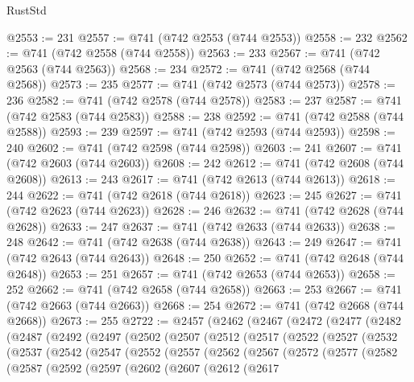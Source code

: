 \begin{lexlean}{RustStd}
\begin{coremodule}
@2553 := 231
@2557 := @741 (@742 @2553 (@744 @2553))
@2558 := 232
@2562 := @741 (@742 @2558 (@744 @2558))
@2563 := 233
@2567 := @741 (@742 @2563 (@744 @2563))
@2568 := 234
@2572 := @741 (@742 @2568 (@744 @2568))
@2573 := 235
@2577 := @741 (@742 @2573 (@744 @2573))
@2578 := 236
@2582 := @741 (@742 @2578 (@744 @2578))
@2583 := 237
@2587 := @741 (@742 @2583 (@744 @2583))
@2588 := 238
@2592 := @741 (@742 @2588 (@744 @2588))
@2593 := 239
@2597 := @741 (@742 @2593 (@744 @2593))
@2598 := 240
@2602 := @741 (@742 @2598 (@744 @2598))
@2603 := 241
@2607 := @741 (@742 @2603 (@744 @2603))
@2608 := 242
@2612 := @741 (@742 @2608 (@744 @2608))
@2613 := 243
@2617 := @741 (@742 @2613 (@744 @2613))
@2618 := 244
@2622 := @741 (@742 @2618 (@744 @2618))
@2623 := 245
@2627 := @741 (@742 @2623 (@744 @2623))
@2628 := 246
@2632 := @741 (@742 @2628 (@744 @2628))
@2633 := 247
@2637 := @741 (@742 @2633 (@744 @2633))
@2638 := 248
@2642 := @741 (@742 @2638 (@744 @2638))
@2643 := 249
@2647 := @741 (@742 @2643 (@744 @2643))
@2648 := 250
@2652 := @741 (@742 @2648 (@744 @2648))
@2653 := 251
@2657 := @741 (@742 @2653 (@744 @2653))
@2658 := 252
@2662 := @741 (@742 @2658 (@744 @2658))
@2663 := 253
@2667 := @741 (@742 @2663 (@744 @2663))
@2668 := 254
@2672 := @741 (@742 @2668 (@744 @2668))
@2673 := 255
@2722 := @2457
    (@2462
      (@2467
        (@2472
          (@2477
            (@2482
              (@2487
                (@2492
                  (@2497
                    (@2502
                      (@2507
                        (@2512
                          (@2517
                            (@2522
                              (@2527
                                (@2532
                                  (@2537
                                    (@2542
                                      (@2547
                                        (@2552
                                          (@2557
                                            (@2562
                                              (@2567
                                                (@2572
                                                  (@2577
                                                    (@2582
                                                      (@2587
                                                        (@2592
                                                          (@2597
                                                            (@2602
                                                              (@2607
                                                                (@2612
                                                                  (@2617

\end{coremodule}
\end{lexlean}

